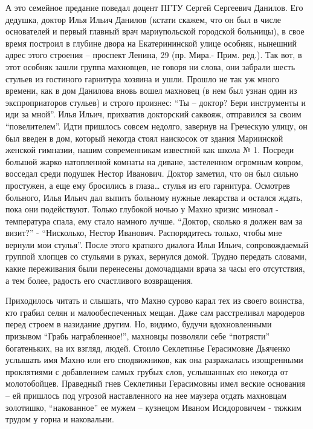 А это семейное предание поведал доцент ПГТУ Сергей Сергеевич Данилов. Его
дедушка, доктор Илья Ильич Данилов (кстати скажем, что он был в числе
основателей и первый главный врач мариупольской городской больницы), в свое
время построил в глубине двора на Екатерининской улице особняк, нынешний адрес
этого строения – проспект Ленина, 29 (пр. Мира.- Прим. ред.). Так вот, в этот
особняк зашли группа махновцев, не говоря ни слова, они забрали шесть стульев
из гостиного гарнитура хозяина и ушли. Прошло не так уж много времени, как в
дом Данилова вновь вошел махновец (в нем был узнан один из экспроприаторов
стульев) и строго произнес: \enquote{Ты – доктор? Бери инструменты и иди за мной}. Илья
Ильич, прихватив докторский саквояж, отправился за своим \enquote{повелителем}. Идти
пришлось совсем недолго, завернув на Греческую улицу, он был введен в дом,
который некогда стоял наискосок от здания Мариинской женской гимназии, нашим
современникам известной как школа № 1. Посреди большой жарко натопленной
комнаты на диване, застеленном огромным  ковром, восседал среди подушек Нестор
Иванович. Доктор заметил, что он был сильно простужен, а еще ему бросились в
глаза… стулья из его гарнитура. Осмотрев больного, Илья Ильич дал выпить
больному нужные лекарства и остался ждать, пока они подействуют. Только
глубокой ночью у Махно кризис миновал - температура спала, ему стало намного
лучше. \enquote{Доктор, сколько я должен вам за визит?} - \enquote{Нисколько, Нестор Иванович.
Распорядитесь только, чтобы мне вернули мои стулья}. После этого краткого
диалога  Илья Ильич, сопровождаемый группой хлопцев со стульями в руках,
вернулся домой. Трудно передать словами, какие переживания были перенесены
домочадцами врача за часы его отсутствия, а тем более, радость его счастливого
возвращения.

Приходилось читать и слышать, что Махно сурово карал тех из своего воинства,
кто грабил селян и малообеспеченных мещан. Даже сам расстреливал мародеров
перед строем в назидание другим. Но, видимо, будучи вдохновленными призывом
\enquote{Грабь награбленное!}, махновцы позволяли себе \enquote{потрясти} богатеньких, на их
взгляд, людей. Стоило Секлетинье Герасимовне Дьяченко услышать имя Махно или
его сподвижников, как она разражалась изощренными проклятиями с добавлением
самых грубых слов, услышанных ею некогда от молотобойцев. Праведный гнев
Секлетиньи Герасимовны имел веские основания – ей пришлось под угрозой
наставленного на нее маузера отдать махновцам золотишко, \enquote{накованное} ее мужем
– кузнецом Иваном Исидоровичем -  тяжким трудом у горна и наковальни.


